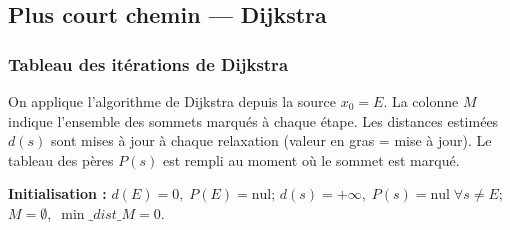 \documentclass[12pt,a4paper]{article}
\begin{document}
\newpage

\subsection{Plus court chemin — Dijkstra}

\subsubsection{Tableau des itérations de Dijkstra}

On applique l'algorithme de Dijkstra depuis la source $x_0 = E$.
La colonne $M$ indique l'ensemble des sommets marqués à chaque étape.
Les distances estimées $d(s)$ sont mises à jour à chaque relaxation (valeur en gras = mise à jour).
Le tableau des pères $P(s)$ est rempli au moment où le sommet est marqué.

\medskip
\noindent\textbf{Initialisation :}
$d(E)=0,\;P(E)=\text{nul}$;\quad
$d(s)=+\infty,\;P(s)=\text{nul}\;\forall s\neq E$;\quad
$M=\emptyset,\;\min\_dist\_M = 0$.
\end{document}
